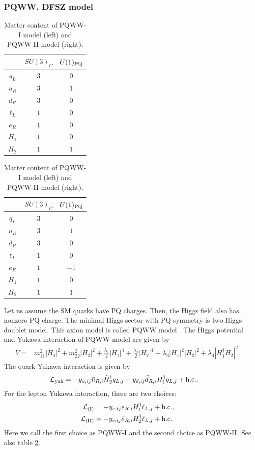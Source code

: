 \documentclass[11pt,a4paper]{article}
\begin{document}
\subsubsection{PQWW, DFSZ model}
\begin{table}[h]
\centering
\begin{tabular}{c|cc}
& $SU(3)_C$ & $U(1)_{\rm PQ}$ \\\hline
$q_L$ & $3$ & $0$ \\
$u_R$ & $3$ & $1$ \\
$d_R$ & $3$ & $0$ \\
$\ell_L$ & $1$ & $0$ \\
$e_R$ & $1$ & $0$ \\
$H_1$ & $1$ & $0$ \\
$H_2$ & $1$ & $1$
\end{tabular}
\qquad\qquad
\begin{tabular}{c|cc}
& $SU(3)_C$ & $U(1)_{\rm PQ}$ \\\hline
$q_L$ & $3$ & $0$ \\
$u_R$ & $3$ & $1$ \\
$d_R$ & $3$ & $0$ \\
$\ell_L$ & $1$ & $0$ \\
$e_R$ & $1$ & $-1$ \\
$H_1$ & $1$ & $0$ \\
$H_2$ & $1$ & $1$
\end{tabular}
\caption{Matter content of PQWW-I model (left) and PQWW-II model (right).}\label{tab:PQWW}
\end{table}
%
Let us assume the SM quarks have PQ charges. Then, the Higgs field also has nonzero PQ charge. The minimal Higgs sector with PQ symmetry is two Higgs doublet model. This axion model is called PQWW model \cite{Weinberg:1977ma,Wilczek:1977pj}.
The Higgs potential and Yukawa interaction of PQWW model are given by
\begin{align}
    V
    =& m_{11}^2 |H_1|^2 + m_{22}^2 |H_2|^2
    + \frac{\lambda_1}{2} |H_1|^4 + \frac{\lambda_2}{2}  |H_2|^4 + \lambda_3 |H_1|^2 |H_2|^2 + \lambda_4 |H_1^\dagger H_2|^2.
\end{align}
The quark Yukawa interaction is given by
\begin{align}
    {\cal L}_{\rm yuk} &= -y_{u,ij} \bar u_{R,i} \tilde H^\dagger_2 q_{L,j}  - y_{d,ij} \bar d_{R,i} H^\dagger_1 q_{L,j} + {\rm h.c.}.
\end{align}
For the lepton Yukawa interaction, there are two choices:
\begin{align}
    {\cal L}_{\rm (I)} &= - y_{e,ij} \bar e_{R,i} H^\dagger_1 \ell_{L,j} + {\rm h.c.}, \\
    {\cal L}_{\rm (II)} &= - y_{e,ij} \bar e_{R,i} H^\dagger_2 \ell_{L,j} + {\rm h.c.}
\end{align}
Here we call the first choice as PQWW-I and the second choice as PQWW-II. See also table \ref{tab:PQWW}.
\end{document}

